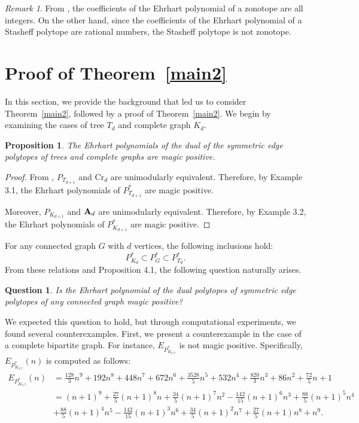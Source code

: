 \documentclass[a4paper,reqno,11pt, oneside]{amsart}
\newtheorem{prop}[thm]{Proposition}
\newtheorem{q}[thm]{Question}
\theoremstyle{definition}
\theoremstyle{remark}
\newtheorem{rem}[thm]{Remark}
\begin{document}
\begin{rem}
From \cite[Theorem 2.2]{RS91}, the coefficients of the Ehrhart polynomial of a zonotope are all integers. On the other hand, since the coefficients of the Ehrhart polynomial of a Stasheff polytope are rational numbers, the Stasheff polytope is not zonotope.
\end{rem}

\section{Proof of Theorem~\ref{main2}}\label{sec:main2}
In this section, we provide the background that led us to consider Theorem~\ref{main2}, followed by a proof of Theorem~\ref{main2}. We begin by examining the cases of tree $T_d$ and complete graph $K_d$.
\begin{prop}
The Ehrhart polynomials of the dual of the symmetric edge polytopes of trees and complete graphs are magic positive.
\end{prop}
\begin{proof}
From {\cite[Proposition 4.6]{MHNOH}}, $P_{T_{d+1}}$ and $\mathrm{Cr}_d$ are unimodularly equivalent. Therefore, by Example 3.1, the Ehrhart polynomials of $P_{T_{d+1}}^\ast$ are magic positive. 

Moreover, $P_{K_{d+1}}$ and ${\bf A}_d$ are unimodularly equivalent. Therefore, by Example 3.2, the Ehrhart polynomials of $P_{K_{d+1}}^\ast$ are magic positive.
\end{proof}

For any connected graph $G$ with $d$ vertices, the following inclusions hold:
$$P_{K_d}^\ast \subset P_{G}^\ast \subset P_{T_d}^\ast.$$
From these relations and Proposition 4.1, the following question naturally arises.
\begin{q}
Is the Ehrhart polynomial of the dual polytopes of symmetric edge polytopes of any connected graph magic positive?
\end{q}
We expected this question to hold, but through computational experiments, we found several counterexamples. First, we present a counterexample in the case of a complete bipartite graph. For instance, $E_{P_{K_{3,7}}^\ast}$ is not magic positive. Specifically, $E_{P_{K_{3,7}}^\ast}(n)$ is computed as follows:
\begin{align*}
E_{P_{K_{3,7}}^\ast}(n) &= \frac{128}{3}n^9 + 192n^8 + 448n^7 + 672n^6 + \frac{3528}{5}n^5 + 532n^4 + \frac{820}{3}n^3 + 86n^2 + \frac{72}{5}n + 1 \\
&=(n+1)^9 + \frac{27}{5}(n+1)^8n + \frac{34}{5}(n+1)^7n^2 -\frac{142}{15}(n+1)^6n^3 + \frac{88}{5}(n+1)^5n^4\\
& + \frac{88}{5}(n+1)^4n^5 -\frac{142}{15}(n+1)^3n^6 + \frac{34}{5}(n+1)^2n^7 + \frac{27}{5}(n+1)n^8 + n^9.
\end{align*}
\end{document}
